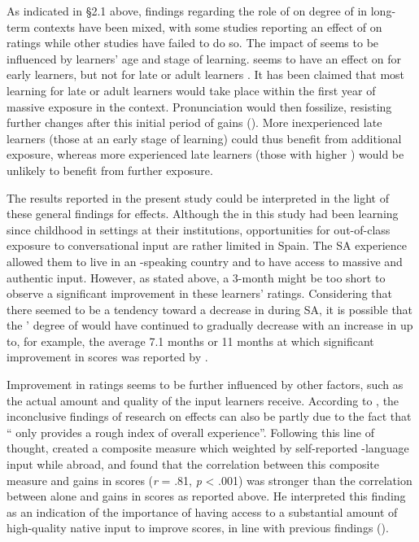 \documentclass[output=paper]{langsci/langscibook}
\begin{document}
As indicated in §2.1 above, findings regarding the role of  on degree of  in long-term  contexts have been mixed, with some studies reporting an effect of  on  ratings while other studies have failed to do so. The impact of  seems to be influenced by  learners’ age and stage of  learning.  seems to have an effect on   for early learners, but not for late or adult learners \citep{Flege1988}. It has been claimed that most   learning for late or adult  learners would take place within the first year of massive exposure in the  context. Pronunciation would then fossilize, resisting further changes after this initial period of gains (\citealt{Selinker1972,Flege1988,Scovel1988,FlegeFletcher1992}). More inexperienced late  learners (those at an early stage of  learning) could thus benefit from additional  exposure, whereas more experienced late  learners (those with higher ) would be unlikely to benefit from further  exposure.

The results reported in the present study could be interpreted in the light of these general findings for  effects. Although the  in this study had been learning  since childhood in  settings at their  institutions, opportunities for out-of-class exposure to conversational  input are rather limited in Spain. The SA experience allowed them to live in an -speaking country and to have access to massive and authentic   input. However, as stated above, a 3-month  might be too short to observe a significant improvement in these learners’  ratings. Considering that there seemed to be a tendency toward a decrease in  during SA, it is possible that the ’ degree of  would have continued to gradually decrease with an increase in  up to, for example, the average 7.1 months or 11 months at which significant improvement in  scores was reported by \cite{Højen2003}.

Improvement in  ratings seems to be further influenced by other factors, such as the actual amount and quality of the  input learners receive. According to \citet[197]{PiskeEtAl2001}, the inconclusive findings of research on  effects can also be partly due to the fact that “ only provides a rough index of overall  experience”. Following this line of thought, \citet{Højen2003} created a composite measure which weighted  by self-reported -language input while abroad, and found that the correlation between this composite measure and gains in  scores (\textit{r} = .81, \textit{p} < .001) was stronger than the correlation between  alone and gains in  scores as reported above. He interpreted this finding as an indication of the importance of having access to a substantial amount of high-quality  native input to improve  scores, in line with previous findings (\citealt{FlegeLiu2001}).
\end{document}

